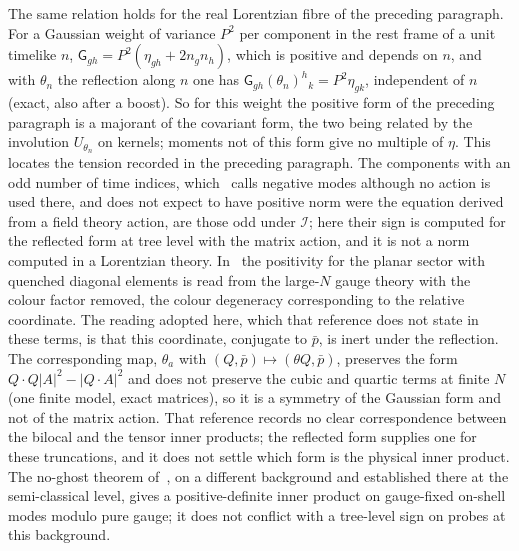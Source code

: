 The same relation holds for the real Lorentzian fibre of the preceding paragraph. For a Gaussian weight of variance \(P^2\) per component in the rest frame of a unit timelike \(n\), \(\mathsf G_{gh}=P^2(\eta_{gh}+2n_gn_h)\), which is positive and depends on \(n\), and with \(\theta_n\) the reflection along \(n\) one has \(\mathsf G_{gh}(\theta_n)^h{}_k=P^2\eta_{gk}\), independent of \(n\) (exact, also after a boost). So for this weight the positive form of the preceding paragraph is a majorant of the covariant form, the two being related by the involution \(U_{\theta_n}\) on kernels; moments not of this form give no multiple of \(\eta\). This locates the tension recorded in the preceding paragraph. The components with an odd number of time indices, which~\cite{FurutaHanadaKawaiKimura2007} calls negative modes although no action is used there, and does not expect to have positive norm were the equation derived from a field theory action, are those odd under \(\mathcal I\); here their sign is computed for the reflected form at tree level with the matrix action, and it is not a norm computed in a Lorentzian theory. In~\cite{HoKawaiSteinacker2025} the positivity for the planar sector with quenched diagonal elements is read from the large-\(N\) gauge theory with the colour factor removed, the colour degeneracy corresponding to the relative coordinate. The reading adopted here, which that reference does not state in these terms, is that this coordinate, conjugate to \(\bar p\), is inert under the reflection. The corresponding map, \(\theta_a\) with \((Q,\bar p)\mapsto(\theta Q,\bar p)\), preserves the form \(Q\cdot Q|A|^2-|Q\cdot A|^2\) and does not preserve the cubic and quartic terms at finite \(N\) (one finite model, exact matrices), so it is a symmetry of the Gaussian form and not of the matrix action. That reference records no clear correspondence between the bilocal and the tensor inner products; the reflected form supplies one for these truncations, and it does not settle which form is the physical inner product. The no-ghost theorem of~\cite{Steinacker2019NoGhost}, on a different background and established there at the semi-classical level, gives a positive-definite inner product on gauge-fixed on-shell modes modulo pure gauge; it does not conflict with a tree-level sign on probes at this background.

